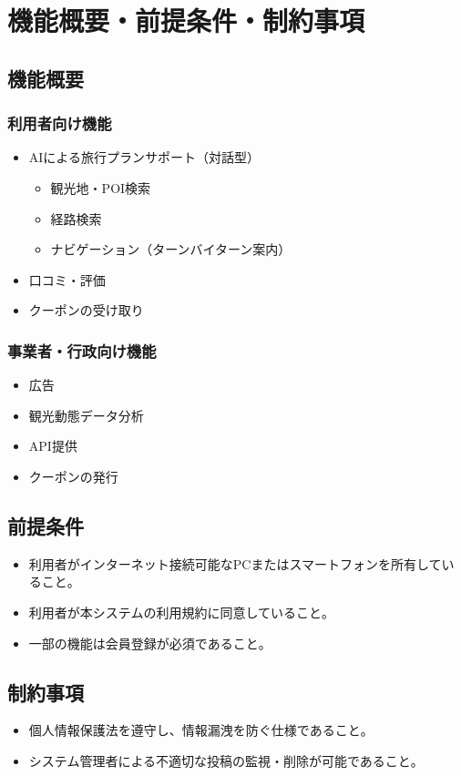 \documentclass{docs}
\begin{document}
\section{機能概要・前提条件・制約事項}

\subsection{機能概要}
\subsubsection{利用者向け機能}
\begin{itemize}
	\item AIによる旅行プランサポート（対話型）
\begin{itemize}
	\item 観光地・POI検索
	\item 経路検索
	\item ナビゲーション（ターンバイターン案内）
\end{itemize}
	\item 口コミ・評価
	\item クーポンの受け取り
\end{itemize}

\subsubsection{事業者・行政向け機能}
\begin{itemize}
	\item 広告
	\item 観光動態データ分析
	\item API提供
	\item クーポンの発行
\end{itemize}

\subsection{前提条件}
\begin{itemize}
	\item 利用者がインターネット接続可能なPCまたはスマートフォンを所有していること。
	\item 利用者が本システムの利用規約に同意していること。
	\item 一部の機能は会員登録が必須であること。
\end{itemize}

\subsection{制約事項}
\begin{itemize}
	\item 個人情報保護法を遵守し、情報漏洩を防ぐ仕様であること。
	\item システム管理者による不適切な投稿の監視・削除が可能であること。
\end{itemize}
\end{document}
